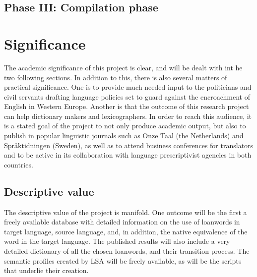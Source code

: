\documentclass[a4paper]{article}
\begin{document}
\subsection{Phase III: Compilation phase}



\section{Significance}
The academic significance of this project is clear, and will be dealt with int he two following sections. In addition to this, there is also several matters of  practical significance. One is to provide much needed input to the politicians and civil servants drafting language policies set to guard against the encroachment of English in Western Europe. Another is that the outcome of this research project can help dictionary makers and lexicographers.
In order to reach this audience, it is a stated goal of the project to not only produce academic output, but also to publish in popular linguistic journals such as Onze Taal (the Netherlands) and Språktidningen (Sweden), as well as to attend business conferences for translators and to be active in its collaboration with language prescriptivist agencies in both countries. 


\subsection{Descriptive value}
The descriptive value of the project is manifold. One outcome will be the first a freely available database with detailed information on the use of loanwords in target language, source language, and, in addition, the native equivalence of the word in the target language. The published results will also include a very detailed dictionary of all the chosen loanwords, and their transition process. The semantic profiles created by LSA will be freely available, as will be the scripts that underlie their creation. 

\end{document}
